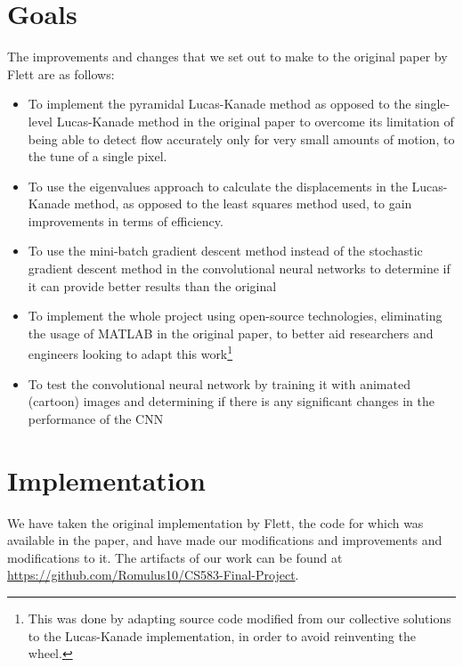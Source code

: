 \documentclass[]{article}
\begin{document}
\section{Goals}\label{sec:goals}
The improvements and changes that we set out to make to the original paper by Flett are as follows:

\begin{itemize}
  \item To implement the pyramidal Lucas-Kanade method as opposed to the single-level Lucas-Kanade method in the original paper to overcome its limitation of being able to detect flow accurately only for very small amounts of motion, to the tune of a single pixel.
  
  \item To use the eigenvalues approach to calculate the displacements in the Lucas-Kanade method, as opposed to the least squares method used, to gain improvements in terms of efficiency.
  
  \item To use the mini-batch gradient descent method instead of the stochastic gradient descent method in the convolutional neural networks to determine if it can provide better results than the original
  
  \item To implement the whole project using open-source technologies, eliminating the usage of MATLAB in the original paper, to better aid researchers and  engineers looking to adapt this work\footnote{This was done by adapting source code modified from our collective solutions to the Lucas-Kanade implementation, in order to avoid reinventing the wheel.}
  
  \item To test the convolutional neural network by training it with animated (cartoon) images and determining if there is any significant changes in the performance of the CNN
\end{itemize}

\section{Implementation}\label{sec:implementation}
We have taken the original implementation by Flett, the code for which was available in the paper, and have made our modifications and improvements and modifications to it. The artifacts of our work can be found at \url{https://github.com/Romulus10/CS583-Final-Project}. 
\end{document}
